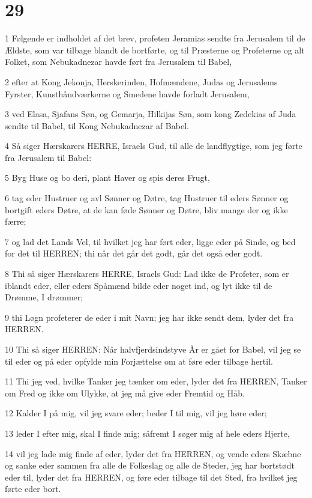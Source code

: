 \chapter{29}

\par 1 Følgende er indholdet af det brev, profeten Jeramias sendte fra Jerusalem til de Ældste, som var tilbage blandt de bortførte, og til Præsterne og Profeterne og alt Folket, som Nebukadnezar havde ført fra Jerusalem til Babel,
\par 2 efter at Kong Jekonja, Herskerinden, Hofmændene, Judas og Jerusalems Fyrster, Kunsthåndværkerne og Smedene havde forladt Jerusalem,
\par 3 ved Elasa, Sjafans Søn, og Gemarja, Hilkijas Søn, som kong Zedekias af Juda sendte til Babel, til Kong Nebukadnezar af Babel.
\par 4 Så siger Hærskarers HERRE, Israels Gud, til alle de landflygtige, som jeg førte fra Jerusalem til Babel:
\par 5 Byg Huse og bo deri, plant Haver og spis deres Frugt,
\par 6 tag eder Hustruer og avl Sønner og Døtre, tag Hustruer til eders Sønner og bortgift eders Døtre, at de kan føde Sønner og Døtre, bliv mange der og ikke færre;
\par 7 og lad det Lands Vel, til hvilket jeg har ført eder, ligge eder på Sinde, og bed for det til HERREN; thi når det går det godt, går det også eder godt.
\par 8 Thi så siger Hærskarers HERRE, Israels Gud: Lad ikke de Profeter, som er iblandt eder, eller eders Spåmænd bilde eder noget ind, og lyt ikke til de Drømme, I drømmer;
\par 9 thi Løgn profeterer de eder i mit Navn; jeg har ikke sendt dem, lyder det fra HERREN.
\par 10 Thi så siger HERREN: Når halvfjerdsindstyve År er gået for Babel, vil jeg se til eder og på eder opfylde min Forjættelse om at føre eder tilbage hertil.
\par 11 Thi jeg ved, hvilke Tanker jeg tænker om eder, lyder det fra HERREN, Tanker om Fred og ikke om Ulykke, at jeg må give eder Fremtid og Håb.
\par 12 Kalder I på mig, vil jeg svare eder; beder I til mig, vil jeg høre eder;
\par 13 leder I efter mig, skal I finde mig; såfremt I søger mig af hele eders Hjerte,
\par 14 vil jeg lade mig finde af eder, lyder det fra HERREN, og vende eders Skæbne og sanke eder sammen fra alle de Folkeslag og alle de Steder, jeg har bortstødt eder til, lyder det fra HERREN, og føre eder tilbage til det Sted, fra hvilket jeg førte eder bort.
